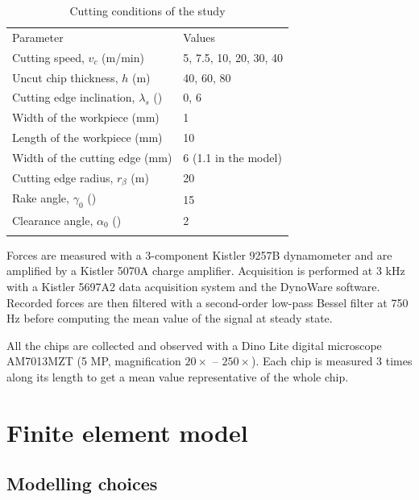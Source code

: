 \documentclass[preprint,12pt,times]{elsarticle}
\begin{document}
%
\begin{table}[!h]
\begin{center}
\caption{\label{tab:CutCond} Cutting conditions of the study}
\begin{tabular}{ll}
\hline\noalign{\smallskip}
Parameter  & Values\\
\noalign{\smallskip}\hline\noalign{\smallskip}
Cutting speed, $v_c$ (m/min) & 5, 7.5, 10, 20, 30, 40\\
Uncut chip thickness, $h$ (\textmu{}m) & 40, 60, 80\\
Cutting edge inclination, $\lambda_s$ (\textdegree{}) & 0, 6\\
Width of the workpiece (mm) & 1\\
Length of the workpiece (mm) & 10\\
Width of the cutting edge (mm) & 6 (1.1 in the model)\\
Cutting edge radius, $r_\beta$ (\textmu{}m) & 20\\
Rake angle, $\gamma_0$ (\textdegree{}) & 15\\
Clearance angle, $\alpha_0$ (\textdegree{}) & 2\\
\noalign{\smallskip}\hline
\end{tabular}
\end{center}
\end{table}
%

Forces are measured with a 3-component Kistler 9257B dynamometer and are amplified by a Kistler 5070A charge amplifier. Acquisition is performed at 3 kHz with a Kistler 5697A2 data acquisition system and the DynoWare software. Recorded forces are then filtered with a second-order low-pass Bessel filter at 750 Hz before computing the mean value of the signal at steady state.

All the chips are collected and observed with a Dino Lite digital microscope AM7013MZT (5 MP, magnification $20\times$ -- $250\times$). Each chip is measured 3 times along its length to get a mean value representative of the whole chip.


\section{Finite element model}
\label{FEM}

\subsection{Modelling choices}
\end{document}
